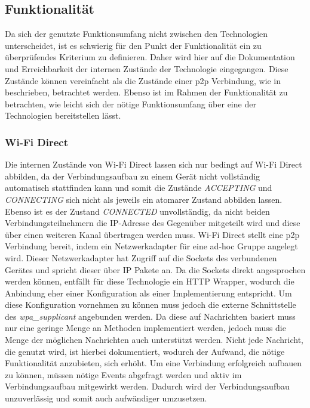 		\subsection{Funktionalität}
      Da sich der genutzte Funktionsumfang nicht zwischen den Technologien unterscheidet, ist es schwierig für den Punkt der Funktionalität ein zu überprüfendes Kriterium zu definieren. Daher wird hier auf die Dokumentation und Erreichbarkeit der internen Zustände der Technologie eingegangen. Diese Zustände können vereinfacht als die Zustände einer p2p Verbindung, wie in  beschrieben, betrachtet werden. Ebenso ist im Rahmen der Funktionalität zu betrachten, wie leicht sich der nötige Funktionsumfang über eine der Technologien bereitstellen lässt.
      
		\subsubsection{Wi-Fi Direct} Die internen Zustände von Wi-Fi Direct lassen sich nur bedingt auf Wi-Fi Direct abbilden, da der Verbindungsaufbau zu einem Gerät nicht vollständig automatisch stattfinden kann und somit die Zustände {\it ACCEPTING} und {\it CONNECTING} sich nicht als jeweils ein atomarer Zustand abbilden lassen. Ebenso ist es der Zustand {\it CONNECTED} unvollständig, da nicht beiden Verbindungsteilnehmern die IP-Adresse des Gegenüber mitgeteilt wird und diese über einen weiteren Kanal übertragen werden muss.
		Wi-Fi Direct stellt eine p2p Verbindung bereit, indem ein Netzwerkadapter für eine ad-hoc Gruppe angelegt wird. Dieser Netzwerkadapter hat Zugriff auf die Sockets des verbundenen Gerätes und spricht dieser über IP Pakete an. Da die Sockets direkt angesprochen werden können, entfällt für diese Technologie ein HTTP Wrapper, wodurch die Anbindung eher einer Konfiguration als einer Implementierung entspricht. Um diese Konfiguration vornehmen zu können muss jedoch die externe Schnittstelle des {\it wpa\_supplicant} angebunden werden. Da diese auf Nachrichten basiert muss nur eine geringe Menge an Methoden implementiert werden, jedoch muss die Menge der möglichen Nachrichten auch unterstützt werden. Nicht jede Nachricht, die genutzt wird, ist hierbei dokumentiert, wodurch der Aufwand, die nötige Funktionalität anzubieten, sich erhöht. Um eine Verbindung erfolgreich aufbauen zu können, müssen nötige Events abgefragt werden und aktiv im Verbindungsaufbau mitgewirkt werden. Dadurch wird der Verbindungsaufbau unzuverlässig und somit auch aufwändiger umzusetzen.
		
